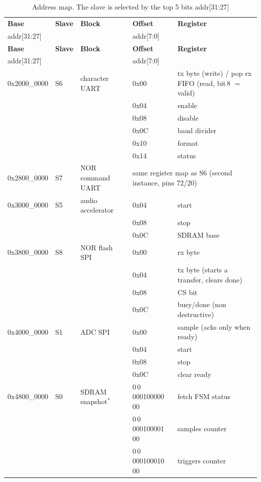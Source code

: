 \documentclass[a4paper,10pt]{article}
\begin{document}
{\footnotesize
\setlength{\LTleft}{\fill}\setlength{\LTright}{\fill}
\begin{longtable}{l l l l p{6.7cm}}
\caption{Address map. The slave is selected by the top 5 bits addr[31:27]}
\label{tab:addrmap}\\
\toprule
\textbf{Base} & \textbf{Slave} & \textbf{Block} & \textbf{Offset} & \textbf{Register} \\
addr[31:27] & & & addr[7:0] & \\
\midrule
\endfirsthead
\toprule
\textbf{Base} & \textbf{Slave} & \textbf{Block} & \textbf{Offset} & \textbf{Register} \\
addr[31:27] & & & addr[7:0] & \\
\midrule
\endhead
\bottomrule
\endlastfoot
0x2000\_0000 & S6 & character UART
 & 0x00 & tx byte (write) / pop rx FIFO (read, bit\,8 $=$ valid) \\
 & & & 0x04 & enable \\
 & & & 0x08 & disable \\
 & & & 0x0C & baud divider \\
 & & & 0x10 & format \\
 & & & 0x14 & status \\
\midrule
0x2800\_0000 & S7 & NOR command UART
 & \multicolumn{2}{l}{same register map as S6 (second instance, pins 72/20)} \\
\midrule
0x3000\_0000 & S5 & audio accelerator
 & 0x04 & start \\
 & & & 0x08 & stop \\
 & & & 0x0C & SDRAM base \\
\midrule
0x3800\_0000 & S8 & NOR flash SPI
 & 0x00 & rx byte \\
 & & & 0x04 & tx byte (starts a transfer, clears done) \\
 & & & 0x08 & CS bit \\
 & & & 0x0C & busy/done (non destructive) \\
\midrule
0x4000\_0000 & S1 & ADC SPI
 & 0x00 & sample (acks only when ready) \\
 & & & 0x04 & start \\
 & & & 0x08 & stop \\
 & & & 0x0C & clear ready \\
\midrule
0x4800\_0000 & S0 & SDRAM snapshot$^{\ast}$
 & 0\,0\,000100000\,00 & fetch FSM status \\
 & & & 0\,0\,000100001\,00 & samples counter \\
 & & & 0\,0\,000100010\,00 & triggers counter \\

\end{longtable}}
\end{document}
